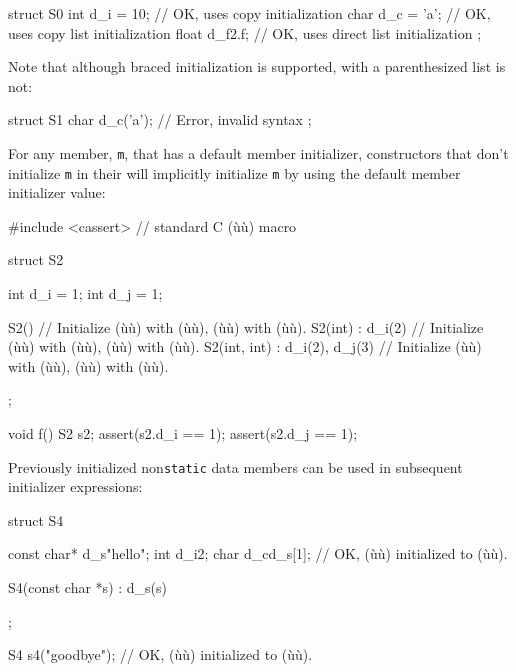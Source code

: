 \begin{emcppslisting}
struct S0
{
    int   d_i = 10;     // OK, uses copy initialization
    char  d_c = {'a'};  // OK, uses copy list initialization
    float d_f{2.f};     // OK, uses direct list initialization
};
\end{emcppslisting}
    

Note that although braced initialization is supported,  with a parenthesized list is not:

\begin{emcppslisting}
struct S1
{
    char d_c('a');  // Error, invalid syntax
};
\end{emcppslisting}
    

For any member, \lstinline!m!, that has a default member initializer,
constructors that don't initialize \lstinline!m! in their  will implicitly initialize \lstinline!m! by using the
default member initializer value:

\begin{emcppslisting}
#include <cassert>  // standard C (ù{}ù) macro

struct S2
{
    int d_i = 1;
    int d_j = 1;

    S2() { }                           // Initialize (ù{}ù) with (ù{}ù), (ù{}ù) with (ù{}ù).
    S2(int) : d_i(2) { }               // Initialize (ù{}ù) with (ù{}ù), (ù{}ù) with (ù{}ù).
    S2(int, int) : d_i(2), d_j(3) { }  // Initialize (ù{}ù) with (ù{}ù), (ù{}ù) with (ù{}ù).
};

void f()
{
    S2 s2;
    assert(s2.d_i == 1);
    assert(s2.d_j == 1);
}
\end{emcppslisting}
    

Previously initialized non\lstinline!static! data members can be used in
subsequent initializer expressions:

\begin{emcppslisting}[emcppsstandards={c++14}]
struct S4
{
    const char* d_s{"hello"};
    int         d_i{2};
    char        d_c{d_s[1]};  // OK, (ù{}ù) initialized to (ù{}ù).

    S4(const char *s) : d_s(s) { }
};

S4 s4("goodbye");          // OK, (ù{}ù) initialized to (ù{}ù).
\end{emcppslisting}
    

